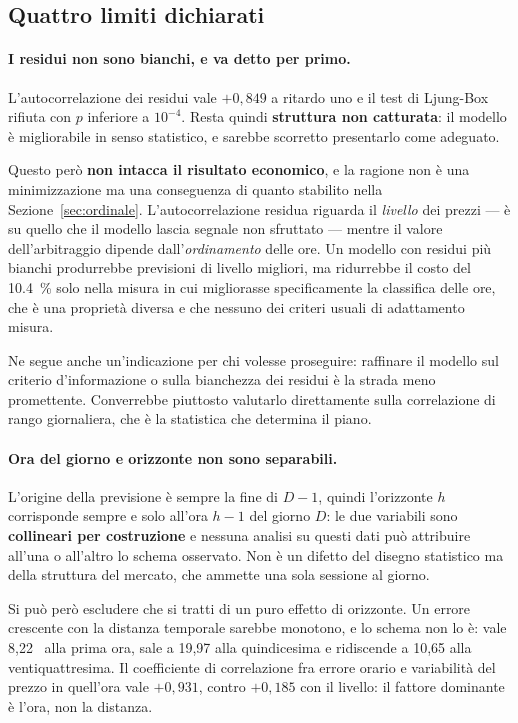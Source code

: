 \subsection{Quattro limiti dichiarati}
\label{sec:limiti-previsione}

\paragraph{I residui non sono bianchi, e va detto per primo.} L'autocorrelazione dei residui
vale $+0{,}849$ a ritardo uno e il test di Ljung-Box rifiuta con $p$ inferiore a $10^{-4}$.
Resta quindi \textbf{struttura non catturata}: il modello \`e migliorabile in senso
statistico, e sarebbe scorretto presentarlo come adeguato.

Questo per\`o \textbf{non intacca il risultato economico}, e la ragione non \`e una
minimizzazione ma una conseguenza di quanto stabilito nella Sezione~\ref{sec:ordinale}.
L'autocorrelazione residua riguarda il \emph{livello} dei prezzi --- \`e su quello che il
modello lascia segnale non sfruttato --- mentre il valore dell'arbitraggio dipende
dall'\emph{ordinamento} delle ore. Un modello con residui pi\`u bianchi produrrebbe previsioni
di livello migliori, ma ridurrebbe il costo del \SI{10,4}{\percent} solo nella misura in cui
migliorasse specificamente la classifica delle ore, che \`e una propriet\`a diversa e che
nessuno dei criteri usuali di adattamento misura.

Ne segue anche un'indicazione per chi volesse proseguire: raffinare il modello sul criterio
d'informazione o sulla bianchezza dei residui \`e la strada meno promettente. Converrebbe
piuttosto valutarlo direttamente sulla correlazione di rango giornaliera, che \`e la
statistica che determina il piano.

\paragraph{Ora del giorno e orizzonte non sono separabili.} L'origine della previsione \`e
sempre la fine di $D-1$, quindi l'orizzonte $h$ corrisponde sempre e solo all'ora $h-1$ del
giorno $D$: le due variabili sono \textbf{collineari per costruzione} e nessuna analisi su
questi dati pu\`o attribuire all'una o all'altro lo schema osservato. Non \`e un difetto del
disegno statistico ma della struttura del mercato, che ammette una sola sessione al giorno.

Si pu\`o per\`o escludere che si tratti di un puro effetto di orizzonte. Un errore crescente
con la distanza temporale sarebbe monotono, e lo schema non lo \`e: vale
8,22~\euromwh{} alla prima ora, sale a 19,97 alla quindicesima e ridiscende
a 10,65 alla ventiquattresima. Il coefficiente di correlazione fra errore orario e
variabilit\`a del prezzo in quell'ora vale $+0{,}931$, contro $+0{,}185$ con il livello: il
fattore dominante \`e l'ora, non la distanza.


